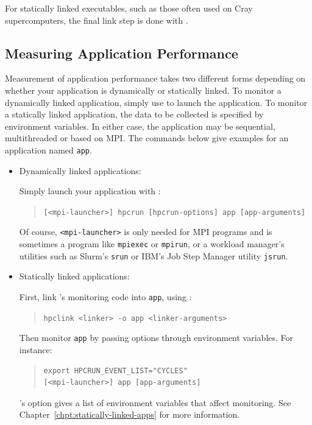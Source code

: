 \documentclass[11pt,twoside,letterpaper]{report}
\begin{document}
For statically linked executables, such as those often used on  Cray supercomputers, the final link step is done with \hpclink{}.


\subsection{Measuring Application Performance}
\label{chpt:quickstart:tour:measurement}

Measurement of application performance takes two different forms depending on whether your application is dynamically or statically linked.
To monitor a dynamically linked application, simply use \hpcrun{} to launch the application.
To monitor a statically linked application, the data to be collected is specified by environment variables.
In either case, the application may be sequential, multithreaded or based on MPI.
The commands below give examples for an application named \texttt{app}.
%
\begin{itemize}

\item Dynamically linked applications:\hfill

Simply launch your application with \hpcrun{}:
\begin{quote}
  \verb|[<mpi-launcher>] hpcrun [hpcrun-options] app [app-arguments]|
\end{quote}
Of course, \texttt{<mpi-launcher>} is only needed for MPI programs and is sometimes a program like \texttt{mpiexec} or \texttt{mpirun}, or a workload manager's utilities such as Slurm's {\tt srun} or IBM's Job Step Manager utility {\tt jsrun}.

\item Statically linked applications:\hfill

First, link \hpcrun{}'s monitoring code into \texttt{app}, using \hpclink{}:
\begin{quote}
  \verb|hpclink <linker> -o app <linker-arguments>|
\end{quote}

Then monitor \texttt{app} by passing \hpcrun{} options through environment variables.
For instance:
\begin{quote}
\begin{verbatim}
export HPCRUN_EVENT_LIST="CYCLES"
[<mpi-launcher>] app [app-arguments]
\end{verbatim}
\end{quote}
\hpclink{}'s  option gives a list of environment variables that affect monitoring.
See Chapter~\ref{chpt:statically-linked-apps} for more information.

\end{itemize}
\end{document}
